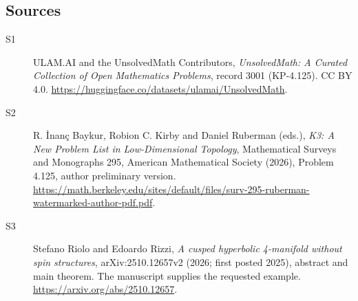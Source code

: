 \documentclass[11pt]{article}
\begin{document}
\subsection{Sources}
\begin{description}
\item[\hypertarget{source:3001:1}{S1}] ULAM.AI and the UnsolvedMath Contributors, \emph{UnsolvedMath: A Curated Collection of Open Mathematics Problems}, record 3001 (KP-4.125). CC BY 4.0. \url{https://huggingface.co/datasets/ulamai/UnsolvedMath}.
\item[\hypertarget{source:3001:2}{S2}] R. İnanç Baykur, Robion C. Kirby and Daniel Ruberman (eds.), \emph{K3: A New Problem List in Low-Dimensional Topology}, Mathematical Surveys and Monographs 295, American Mathematical Society (2026), Problem 4.125, author preliminary version. \url{https://math.berkeley.edu/sites/default/files/surv-295-ruberman-watermarked-author-pdf.pdf}.
\item[\hypertarget{source:3001:3}{S3}] Stefano Riolo and Edoardo Rizzi, \emph{A cusped hyperbolic 4-manifold without spin structures}, arXiv:2510.12657v2 (2026; first posted 2025), abstract and main theorem. The manuscript supplies the requested example. \url{https://arxiv.org/abs/2510.12657}.
\end{description}
\label{end:3001}
\end{document}
